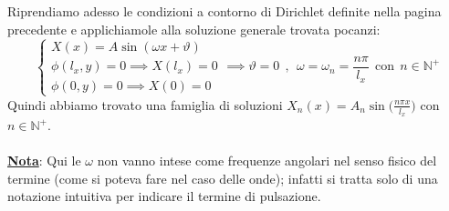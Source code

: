 \documentclass[a4paper,12pt]{report}
\begin{document}
Riprendiamo adesso le condizioni a contorno di Dirichlet definite nella pagina precedente e applichiamole alla soluzione generale trovata pocanzi:
\[\begin{cases}
    X(x)=A\sin(\omega x+\vartheta)
    \\\phi(l_x,y)=0\implies X(l_x)=0
    \\\phi(0,y)=0\implies X(0)=0
\end{cases}\implies \vartheta=0\ \ ,\ \ \omega=\omega_n=\frac{n\pi }{l_x}\ \ \text{con}\ \ n\in \mathbb{N}^+\]
Quindi abbiamo trovato una famiglia di soluzioni $X_n(x)=A_n\sin\bigg(\frac{n\pi x}{l_x}\bigg)$ con $n\in \mathbb{N}^+$. 
\\
\\ \underline{\textbf{Nota}}: Qui le $\omega$ non vanno intese come frequenze angolari nel senso fisico del termine (come si poteva fare nel caso delle onde); infatti si tratta solo di una notazione intuitiva per indicare il termine di pulsazione.
\end{document}

